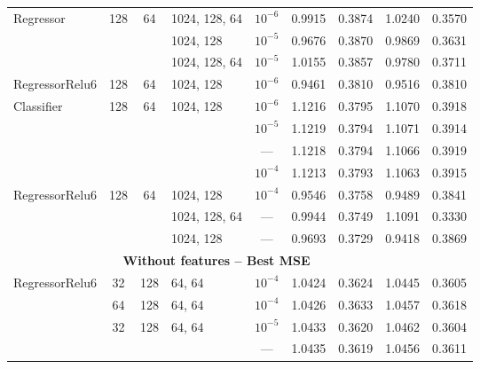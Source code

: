 \begin{table}[H]
\begin{tabular}{lcclccccc}
Regressor & 128 & 64 & 1024, 128, 64 & $10^{-6}$   &  0.9915 &      0.3874 &   1.0240 &        0.3570 \\
           &     &    & 1024, 128 & $10^{-5}$   &  0.9676 &      0.3870 &   0.9869 &        0.3631 \\
           &     &    & 1024, 128, 64 & $10^{-5}$   &  1.0155 &      0.3857 &   0.9780 &        0.3711 \\
RegressorRelu6 & 128 & 64 & 1024, 128 & $10^{-6}$   &  0.9461 &      0.3810 &   0.9516 &        0.3810 \\
Classifier & 128 & 64 & 1024, 128 & $10^{-6}$   &  1.1216 &      0.3795 &   1.1070 &        0.3918 \\
           &     &    &                                 & $10^{-5}$   &  1.1219 &      0.3794 &   1.1071 &        0.3914 \\
           &     &    &                                 & ---   &  1.1218 &      0.3794 &   1.1066 &        0.3919 \\
           &     &    &                                 & $10^{-4}$   &  1.1213 &      0.3793 &   1.1063 &        0.3915 \\
RegressorRelu6 & 128 & 64 & 1024, 128 & $10^{-4}$   &  0.9546 &      0.3758 &   0.9489 &        0.3841 \\
           &     &    & 1024, 128, 64 & ---   &  0.9944 &      0.3749 &   1.1091 &        0.3330 \\
           &     &    & 1024, 128 & ---   &  0.9693 &      0.3729 &   0.9418 &        0.3869 \\
\midrule
\multicolumn{8}{c}{\textbf{Without features -- Best MSE}}\\\addlinespace
RegressorRelu6 & 32 & 128 & 64, 64 & $10^{-4}$ &  1.0424 &      0.3624 &   1.0445 &        0.3605 \\
                & 64 & 128 & 64, 64 & $10^{-4}$ &  1.0426 &      0.3633 &   1.0457 &        0.3618 \\
                & 32 & 128 & 64, 64 & $10^{-5}$ &  1.0433 &      0.3620 &   1.0462 &        0.3604 \\
                &    &     &        & --- &  1.0435 &      0.3619 &   1.0456 &        0.3611 \\
%      

\end{tabular}
\end{table}
